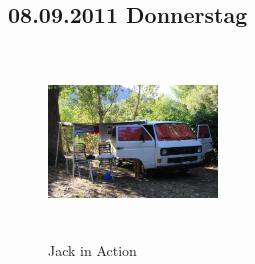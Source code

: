 \subsection{08.09.2011 Donnerstag}

\begin{figure} 
  \begin{centering}
    \includegraphics[width=0.4\textwidth, height=5cm, keepaspectratio]{../Bilder/Korsika/32.jpg}
    \caption{Jack in Action}
  \end{centering}
\end{figure} 


